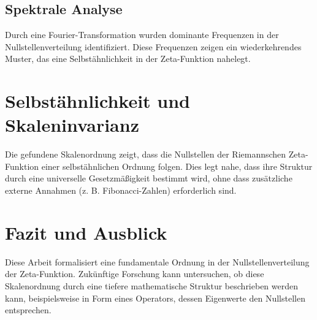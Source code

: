 \documentclass[a4paper,12pt]{article}
\begin{document}
\subsection{Spektrale Analyse}
Durch eine Fourier-Transformation wurden dominante Frequenzen in der Nullstellenverteilung identifiziert. Diese Frequenzen zeigen ein wiederkehrendes Muster, das eine Selbstähnlichkeit in der Zeta-Funktion nahelegt.

\section{Selbstähnlichkeit und Skaleninvarianz}
Die gefundene Skalenordnung zeigt, dass die Nullstellen der Riemannschen Zeta-Funktion einer selbstähnlichen Ordnung folgen. Dies legt nahe, dass ihre Struktur durch eine universelle Gesetzmäßigkeit bestimmt wird, ohne dass zusätzliche externe Annahmen (z. B. Fibonacci-Zahlen) erforderlich sind.

\section{Fazit und Ausblick}
Diese Arbeit formalisiert eine fundamentale Ordnung in der Nullstellenverteilung der Zeta-Funktion. Zukünftige Forschung kann untersuchen, ob diese Skalenordnung durch eine tiefere mathematische Struktur beschrieben werden kann, beispielsweise in Form eines Operators, dessen Eigenwerte den Nullstellen entsprechen.
\end{document}

